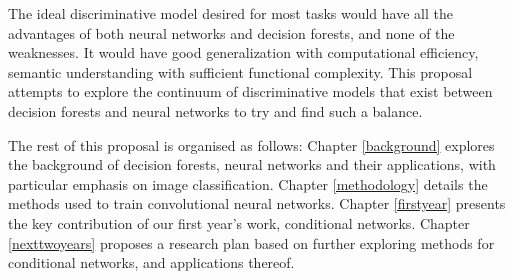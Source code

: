 \documentclass[thesis]{subfiles}
\begin{document}
The ideal discriminative model desired for most tasks would have all the advantages of both neural networks and decision forests, and none of the weaknesses. It would have good generalization with computational efficiency, semantic understanding with sufficient functional complexity. This proposal attempts to explore the continuum of discriminative models that exist between decision forests and neural networks to try and find such a balance.

The rest of this proposal is organised as follows: Chapter \ref{background} explores the background of decision forests, neural networks and their applications, with particular emphasis on image classification. Chapter \ref{methodology} details the methods used to train convolutional neural networks. Chapter \ref{firstyear} presents the key contribution of our first year's work, conditional networks. Chapter \ref{nexttwoyears} proposes a research plan based on further exploring methods for conditional networks, and applications thereof.

\end{document}
